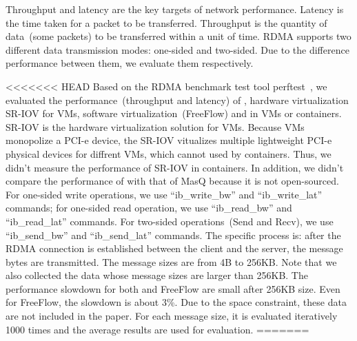 Throughput and latency are the key targets of network performance. Latency is the time taken for a packet to be transferred. Throughput is the quantity of data~(some packets) to be transferred within a unit of time. RDMA supports two different data transmission modes: one-sided and two-sided. Due to the difference performance between them, we evaluate them respectively.

<<<<<<< HEAD
Based on the RDMA benchmark test tool perftest~\cite{perftest}, we evaluated the performance~(throughput and latency) of \native, hardware virtualization SR-IOV for VMs,  software virtualization~(FreeFlow) and \sys in VMs or containers. SR-IOV is the hardware virtualization solution for VMs. Because VMs monopolize a PCI-e device, the SR-IOV vitualizes multiple lightweight PCI-e physical devices for diffrent VMs, which cannot used by containers. Thus, we didn't measure the performance of SR-IOV in containers. In addition, we didn't compare the performance of \sys with that of MasQ because it is not open-sourced. For one-sided write operations, we use ``ib\_write\_bw'' and ``ib\_write\_lat'' commands; for one-sided read operation, we use ``ib\_read\_bw'' and ``ib\_read\_lat'' commands. For two-sided operations~(Send and Recv), we use ``ib\_send\_bw'' and ``ib\_send\_lat'' commands. The specific process is: after the RDMA connection is established between the client and the server, the message bytes are transmitted. The message sizes are from 4B to 256KB. Note that we also collected the data whose message sizes are larger than 256KB. The performance slowdown for both \sys and FreeFlow are small after 256KB size. Even for FreeFlow, the slowdown is about 3\%. Due to the space constraint, these data are not included in the paper. For each message size,  it is evaluated iteratively 1000 times and the average results are used for evaluation.  
=======
